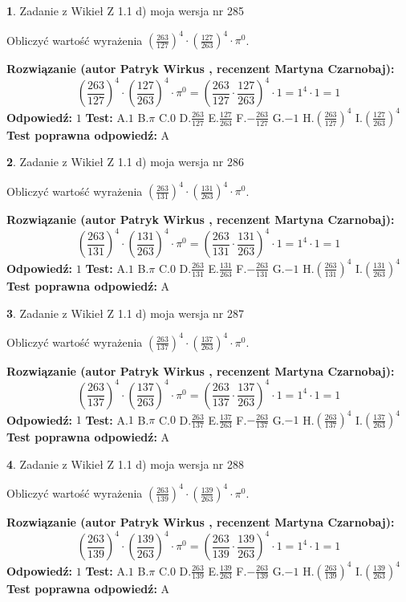 \documentclass[12pt, a4paper]{article}
\theoremstyle{definition} %
\newtheorem{zad}{}
\newcommand{\zadStart}[1]{\begin{zad}#1\newline}
\newcommand{\zadStop}{\end{zad}}
\newcommand{\rozwStart}[2]{\noindent \textbf{Rozwiązanie (autor #1 , recenzent #2): }\newline}
\newcommand{\rozwStop}{\newline}
\newcommand{\odpStart}{\noindent \textbf{Odpowiedź:}\newline}
\newcommand{\odpStop}{\newline}
\newcommand{\testStart}{\noindent \textbf{Test:}\newline}
\newcommand{\testStop}{\newline}
\newcommand{\kluczStart}{\noindent \textbf{Test poprawna odpowiedź:}\newline}
\newcommand{\kluczStop}{\newline}
\begin{document}
\zadStart{Zadanie z Wikieł Z 1.1 d) moja wersja nr 285}

Obliczyć wartość wyrażenia $(\frac{263}{127})^{4} \cdot (\frac{127}{263})^{4} \cdot \pi^{0}$.
\zadStop
\rozwStart{Patryk Wirkus}{Martyna Czarnobaj}
$$(\frac{263}{127})^{4} \cdot (\frac{127}{263})^{4} \cdot \pi^{0} = (\frac{263}{127} \cdot \frac{127}{263})^{4} \cdot 1 = 1^{4} \cdot 1 = 1$$
\rozwStop
\odpStart
$1$
\odpStop
\testStart
A.$1$ B.$\pi$ C.$0$ D.$\frac{263}{127}$ E.$\frac{127}{263}$
F.$-\frac{263}{127}$ G.$-1$
H.$(\frac{263}{127})^{4}$
I.$(\frac{127}{263})^{4}$
\testStop
\kluczStart
A
\kluczStop



\zadStart{Zadanie z Wikieł Z 1.1 d) moja wersja nr 286}

Obliczyć wartość wyrażenia $(\frac{263}{131})^{4} \cdot (\frac{131}{263})^{4} \cdot \pi^{0}$.
\zadStop
\rozwStart{Patryk Wirkus}{Martyna Czarnobaj}
$$(\frac{263}{131})^{4} \cdot (\frac{131}{263})^{4} \cdot \pi^{0} = (\frac{263}{131} \cdot \frac{131}{263})^{4} \cdot 1 = 1^{4} \cdot 1 = 1$$
\rozwStop
\odpStart
$1$
\odpStop
\testStart
A.$1$ B.$\pi$ C.$0$ D.$\frac{263}{131}$ E.$\frac{131}{263}$
F.$-\frac{263}{131}$ G.$-1$
H.$(\frac{263}{131})^{4}$
I.$(\frac{131}{263})^{4}$
\testStop
\kluczStart
A
\kluczStop



\zadStart{Zadanie z Wikieł Z 1.1 d) moja wersja nr 287}

Obliczyć wartość wyrażenia $(\frac{263}{137})^{4} \cdot (\frac{137}{263})^{4} \cdot \pi^{0}$.
\zadStop
\rozwStart{Patryk Wirkus}{Martyna Czarnobaj}
$$(\frac{263}{137})^{4} \cdot (\frac{137}{263})^{4} \cdot \pi^{0} = (\frac{263}{137} \cdot \frac{137}{263})^{4} \cdot 1 = 1^{4} \cdot 1 = 1$$
\rozwStop
\odpStart
$1$
\odpStop
\testStart
A.$1$ B.$\pi$ C.$0$ D.$\frac{263}{137}$ E.$\frac{137}{263}$
F.$-\frac{263}{137}$ G.$-1$
H.$(\frac{263}{137})^{4}$
I.$(\frac{137}{263})^{4}$
\testStop
\kluczStart
A
\kluczStop



\zadStart{Zadanie z Wikieł Z 1.1 d) moja wersja nr 288}

Obliczyć wartość wyrażenia $(\frac{263}{139})^{4} \cdot (\frac{139}{263})^{4} \cdot \pi^{0}$.
\zadStop
\rozwStart{Patryk Wirkus}{Martyna Czarnobaj}
$$(\frac{263}{139})^{4} \cdot (\frac{139}{263})^{4} \cdot \pi^{0} = (\frac{263}{139} \cdot \frac{139}{263})^{4} \cdot 1 = 1^{4} \cdot 1 = 1$$
\rozwStop
\odpStart
$1$
\odpStop
\testStart
A.$1$ B.$\pi$ C.$0$ D.$\frac{263}{139}$ E.$\frac{139}{263}$
F.$-\frac{263}{139}$ G.$-1$
H.$(\frac{263}{139})^{4}$
I.$(\frac{139}{263})^{4}$
\testStop
\kluczStart
A
\kluczStop
\end{document}
